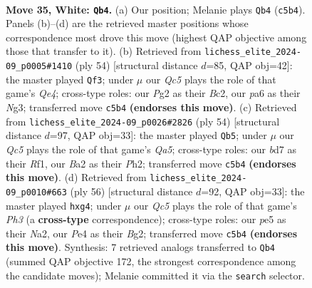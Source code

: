 \documentclass[11pt]{article}
\begin{document}
\clearpage

\begin{figure}[p]\centering
\begin{subfigure}{0.46\textwidth}\centering
\resizebox{\linewidth}{!}{%
\newchessgame
\chessboard[
  setfen={3qn2r/3b2k1/p4p2/n1Q1p1pp/P2PP3/N1P5/B4PPP/R3K1N1 w - - 0 35},
  showmover=false,
  pgfstyle=straightmove, color=movearrow, markmove={c5-b4}
]}
\caption{}
\end{subfigure}\hfill
\begin{subfigure}{0.46\textwidth}\centering
\resizebox{\linewidth}{!}{%
\newchessgame
\chessboard[
  setfen={r5k1/3q1p2/p1p1bbpB/3n4/1p1PQ3/2P3N1/PPB2P2/4R1K1 w - - 0 28},
  showmover=false,
  pgfstyle=straightmove, color=movearrow, markmove={e4-f3}
]}
\caption{}
\end{subfigure}
\\[4pt]
\begin{subfigure}{0.46\textwidth}\centering
\resizebox{\linewidth}{!}{%
\newchessgame
\chessboard[
  setfen={5rk1/1pp3pp/1n6/Q2pNp1q/P2P1P1b/1PP4B/7P/5R1K w - - 0 28},
  showmover=false,
  pgfstyle=straightmove, color=movearrow, markmove={a5-b5}
]}
\caption{}
\end{subfigure}\hfill
\begin{subfigure}{0.46\textwidth}\centering
\resizebox{\linewidth}{!}{%
\newchessgame
\chessboard[
  setfen={1n1qr1k1/5pp1/p2b3p/1p1P3b/4p1n1/PNQ1B2P/NP3PB1/3R2K1 w - - 0 29},
  showmover=false,
  pgfstyle=straightmove, color=movearrow, markmove={h3-g4}
]}
\caption{}
\end{subfigure}
\caption{\textbf{Move 35, White: \texttt{Qb4}.} (a) Our position; Melanie plays \texttt{Qb4} (\texttt{c5b4}). Panels (b)--(d) are the retrieved master positions whose correspondence most drove this move (highest QAP objective among those that transfer to it). (b) Retrieved from \texttt{lichess\_elite\_2024-09\_p0005\#1410} (ply 54) [structural distance $d$=85, QAP obj=42]: the master played \texttt{Qf3}; under $\mu$ our \emph{Qc5} plays the role of that game's \emph{Qe4}; cross-type roles: our \emph{P}g2 as their \emph{B}c2, our \emph{p}a6 as their \emph{N}g3; transferred move \texttt{c5b4} \textbf{(endorses this move)}. (c) Retrieved from \texttt{lichess\_elite\_2024-09\_p0026\#2826} (ply 54) [structural distance $d$=97, QAP obj=33]: the master played \texttt{Qb5}; under $\mu$ our \emph{Qc5} plays the role of that game's \emph{Qa5}; cross-type roles: our \emph{b}d7 as their \emph{R}f1, our \emph{B}a2 as their \emph{P}h2; transferred move \texttt{c5b4} \textbf{(endorses this move)}. (d) Retrieved from \texttt{lichess\_elite\_2024-09\_p0010\#663} (ply 56) [structural distance $d$=92, QAP obj=33]: the master played \texttt{hxg4}; under $\mu$ our \emph{Qc5} plays the role of that game's \emph{Ph3} (a \textbf{cross-type} correspondence); cross-type roles: our \emph{p}e5 as their \emph{N}a2, our \emph{P}e4 as their \emph{B}g2; transferred move \texttt{c5b4} \textbf{(endorses this move)}. Synthesis: 7 retrieved analogs transferred to \texttt{Qb4} (summed QAP objective 172, the strongest correspondence among the candidate moves); Melanie committed it via the \texttt{search} selector.}
\label{fig:thought-m68}
\end{figure}
\end{document}
